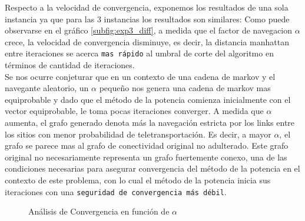 \begin{LaTeXdescription}
    Respecto a la velocidad de convergencia, exponemos los resultados de una sola instancia ya que para las 3 instancias los resultados son similares: Como puede observarse en el gráfico \ref{subfig:exp3_diff}, a medida que el factor de navegacion $ \alpha $ crece, la velocidad de convergencia disminuye, es decir, la distancia manhattan entre iteraciones se acerca \texttt{mas rápido} al umbral de corte del algoritmo en términos de cantidad de iteraciones.\\

    Se nos ocurre conjeturar que en un contexto de una cadena de markov y el navegante aleatorio, un $\alpha$ pequeño nos genera una cadena de markov mas equiprobable y dado que el método de la potencia comienza inicialmente con el vector equiprobable, le toma pocas iteraciones converger. A medida que $\alpha$ aumenta, el grafo generado denota más la navegación estricta por los links entre los sitios con menor probabilidad de teletransportación. Es decir, a mayor $\alpha$, el grafo se parece mas al grafo de conectividad original no adulterado. Este grafo original no necesariamente representa un grafo fuertemente conexo, una de las condiciones necesarias para asegurar convergencia del método de la potencia en el contexto de este problema, con lo cual el método de la potencia inicia sus iteraciones con una \texttt{seguridad de convergencia más débil}.
\end{LaTeXdescription}

\begin{figure}[!h]
    \centering
    \caption{An\'alisis de Convergencia en funci\'on de $\alpha$}
\end{figure}


